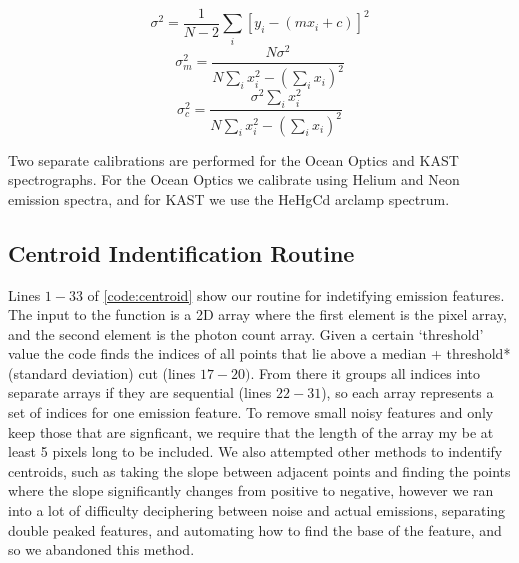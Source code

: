 \documentclass[preprint]{aastex62}
\begin{document}
\begin{equation}
    \sigma^2 = \frac{1}{N-2}\sum_i [y_i - (mx_i + c)]^2
\end{equation}
\begin{equation}
    \sigma_m^2 = \frac{N\sigma^2}{N\sum_i x_i^2 - \left(\sum_i x_i \right)^2}
\end{equation}
\begin{equation}
    \sigma_c^2 = \frac{\sigma^2 \sum_i x_i^2}{N\sum_i x_i^2 - \left(\sum_i x_i \right)^2}
\end{equation}

Two separate calibrations are performed for the Ocean Optics and KAST spectrographs. For the Ocean Optics we calibrate using Helium and Neon emission spectra, and for KAST we use the HeHgCd arclamp spectrum.

\subsection{Centroid Indentification Routine}
Lines $1-33$ of \ref{code:centroid} show our routine for indetifying emission features. The input to the function is a 2D array where the first element is the pixel array, and the second element is the photon count array. Given a certain `threshold' value the code finds the indices of all points that lie above a median + threshold*(standard deviation) cut (lines $17-20)$. From there it groups all indices into separate arrays if they are sequential (lines $22-31$), so each array represents a set of indices for one emission feature. To remove small noisy features and only keep those that are signficant, we require that the length of the array my be at least 5 pixels long to be included. We also attempted other methods to indentify centroids, such as taking the slope between adjacent points and finding the points where the slope significantly changes from positive to negative, however we ran into a lot of difficulty deciphering between noise and actual emissions, separating double peaked features, and automating how to find the base of the feature, and so we abandoned this method.
\end{document}
